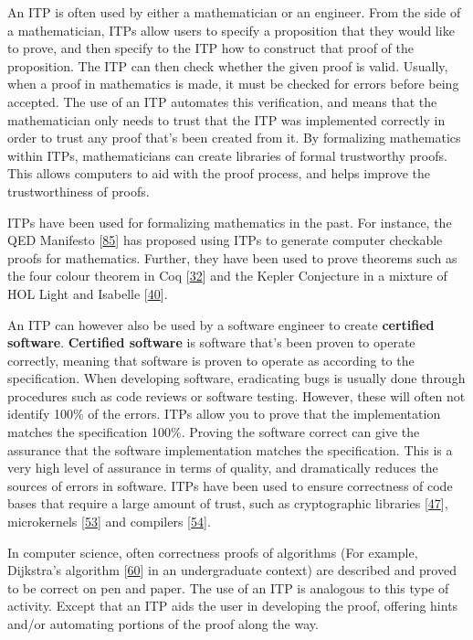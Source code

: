 \documentclass[
]{article}
\begin{document}
An ITP is often used by either a mathematician or an engineer. From the
side of a mathematician, ITPs allow users to specify a proposition that
they would like to prove, and then specify to the ITP how to construct
that proof of the proposition. The ITP can then check whether the given
proof is valid. Usually, when a proof in mathematics is made, it must be
checked for errors before being accepted. The use of an ITP automates
this verification, and means that the mathematician only needs to trust
that the ITP was implemented correctly in order to trust any proof
that's been created from it. By formalizing mathematics within ITPs,
mathematicians can create libraries of formal trustworthy proofs. This
allows computers to aid with the proof process, and helps improve the
trustworthiness of proofs.

ITPs have been used for formalizing mathematics in the past. For
instance, the QED Manifesto
{[}\protect\hyperlink{ref-QED_Manifesto}{85}{]} has proposed using ITPs
to generate computer checkable proofs for mathematics. Further, they
have been used to prove theorems such as the four colour theorem in Coq
{[}\protect\hyperlink{ref-Four_Color}{32}{]} and the Kepler Conjecture
in a mixture of HOL Light and Isabelle
{[}\protect\hyperlink{ref-Flyspeck}{40}{]}.

An ITP can however also be used by a software engineer to create
\textbf{certified software}. \textbf{Certified software} is software
that's been proven to operate correctly, meaning that software is proven
to operate as according to the specification. When developing software,
eradicating bugs is usually done through procedures such as code reviews
or software testing. However, these will often not identify 100\% of the
errors. ITPs allow you to prove that the implementation matches the
specification 100\%. Proving the software correct can give the assurance
that the software implementation matches the specification. This is a
very high level of assurance in terms of quality, and dramatically
reduces the sources of errors in software. ITPs have been used to ensure
correctness of code bases that require a large amount of trust, such as
cryptographic libraries {[}\protect\hyperlink{ref-HACL}{47}{]},
microkernels {[}\protect\hyperlink{ref-Sel4}{53}{]} and compilers
{[}\protect\hyperlink{ref-CompCert}{54}{]}.

In computer science, often correctness proofs of algorithms (For
example, Dijkstra's algorithm
{[}\protect\hyperlink{ref-DijkstraACL2}{60}{]} in an undergraduate
context) are described and proved to be correct on pen and paper. The
use of an ITP is analogous to this type of activity. Except that an ITP
aids the user in developing the proof, offering hints and/or automating
portions of the proof along the way.
\end{document}
